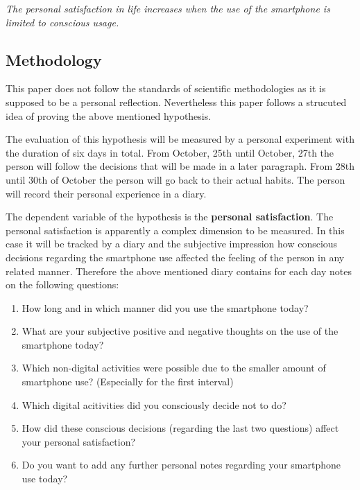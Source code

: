 \documentclass[11pt,letterpaper]{article}
\begin{document}
\begin{center}
\textit{The personal satisfaction in life increases when the use of the smartphone is limited to conscious usage.}
 \end{center}

\subsection*{Methodology}
This paper does not follow the standards of scientific methodologies as it is supposed to be a personal reflection. Nevertheless this paper follows a strucuted idea of proving the above mentioned hypothesis.

The evaluation of this hypothesis will be measured by a personal experiment with the duration of six days in total. From October, 25th until October, 27th the person will follow the decisions that will be made in a later paragraph. From 28th until 30th of October the person will go back to their actual habits. The person will record their personal experience in a diary. 

The dependent variable of the hypothesis is the \textbf{personal satisfaction}. The personal satisfaction is apparently a complex dimension to be measured. In this case it will be tracked by a diary and the subjective impression how conscious decisions regarding the smartphone use affected the feeling of the person in any related manner. Therefore the above mentioned diary contains for each day notes on the following questions:
\begin{enumerate}
\item 
How long and in which manner did you use the smartphone today?

\item
What are your subjective positive and negative thoughts on the use of the smartphone today?

\item
Which non-digital activities were possible due to the smaller amount of smartphone use? (Especially for the first interval)

\item
Which digital acitivities did you consciously decide not to do?

\item
How did these conscious decisions (regarding the last two questions) affect your personal satisfaction?

\item
Do you want to add any further personal notes regarding your smartphone use today?

\end{enumerate}
\end{document}
